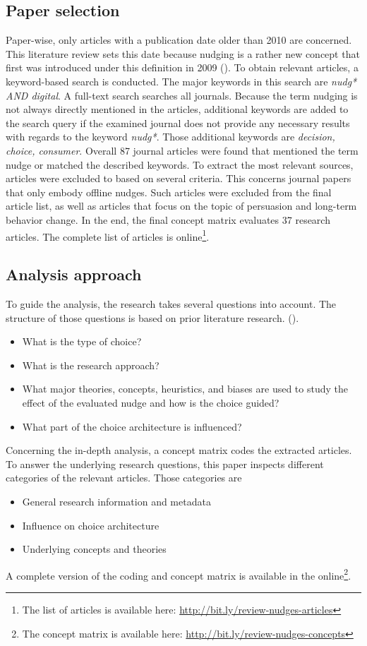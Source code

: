\subsection{Paper selection}
Paper-wise, only articles with a publication date older than 2010 are concerned. This literature review sets this date because nudging is a rather new concept that first was introduced under this definition in 2009 (\cite{thaler_nudge:_2009}). To obtain relevant articles, a keyword-based search is conducted. The major keywords in this search are \textit{nudg* AND digital}. A full-text search searches all journals. Because the term nudging is not always directly mentioned in the articles, additional keywords are added to the search query if the examined journal does not provide any necessary results with regards to the keyword \textit{nudg*}. Those additional keywords are \textit{decision, choice, consumer}. Overall 87 %
 journal articles were found that mentioned the term nudge or matched the described keywords. To extract the most relevant sources, articles were excluded to based on several criteria. This concerns journal papers that only embody offline nudges. Such articles were excluded from the final article list, as well as articles that focus on the topic of persuasion and long-term behavior change. In the end, the final concept matrix evaluates 37 research articles. The complete list of articles is online\footnote{The list of articles is available here: \url{http://bit.ly/review-nudges-articles}}.

\subsection{Analysis approach}
To guide the analysis, the research takes several questions into account. The structure of those questions is based on prior literature research. (\cite{alavi_review_1992}).
\begin{itemize}
\item What is the type of choice?
\item What is the research approach?
\item What major theories, concepts, heuristics, and biases are used to study the effect of the evaluated nudge and how is the choice guided?
\item What part of the choice architecture is influenced?
\end{itemize}

Concerning the in-depth analysis, a concept matrix codes the extracted articles. To answer the underlying research questions, this paper inspects different categories of the relevant articles. Those categories are 
\begin{itemize}
\item General research information and metadata
\item Influence on choice architecture
\item Underlying concepts and theories
\end{itemize}

A complete version of the coding and concept matrix is available in the online\footnote{The concept matrix is available here: \url{http://bit.ly/review-nudges-concepts}}.